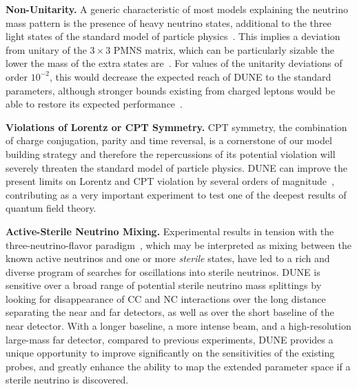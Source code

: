 {\bf Non-Unitarity.} 
A generic characteristic of most models explaining the neutrino mass
pattern is the presence of heavy neutrino states, additional to the
three light states of the standard model of particle
physics~\cite{Minkowski:1977sc,Mohapatra:1979ia,Yanagida:1979as,GellMann:1980vs}. This implies a deviation from unitary of the $3\times3$ PMNS matrix, which can be particularly sizable the lower the mass of the extra states are~\cite{Mohapatra:1986bd,Akhmedov:1995vm,Akhmedov:1995ip,Malinsky:2005bi}.
For values of the unitarity deviations of order $10^{-2}$, this would decrease the expected reach of DUNE to the standard parameters, although stronger bounds existing from charged leptons would be able to restore its expected performance~\cite{Blennow:2016jkn,Escrihuela:2016ube}.

{\bf Violations of Lorentz or CPT Symmetry.}
CPT symmetry, the combination of charge conjugation, parity and time reversal, is a cornerstone of our model building strategy and therefore the repercussions of its potential violation will severely threaten the standard model of particle physics. DUNE can improve the present limits on Lorentz and CPT violation by several orders of magnitude~\cite{Kostelecky:2003cr,Kostelecky:2011gq,Streater:1989vi,Barenboim:2002tz,Barenboim:2017ewj}, contributing
as a very important experiment to test one of the deepest results of quantum field theory.

{\bf Active-Sterile Neutrino Mixing.}
Experimental results in tension with the three-neutrino-flavor paradigm~\cite{Aguilar:2001ty,Aguilar-Arevalo:2013pmq,Acero:2007su,Mention:2011rk}, which may be interpreted as mixing between the known active neutrinos and one or more {\it sterile} states, have led to a rich and diverse program of searches for oscillations into sterile neutrinos.
DUNE is sensitive over a broad range of potential sterile neutrino mass splittings by looking for disappearance of CC and NC interactions over the long distance separating the near and far detectors, as well as over the short baseline of the near detector. 
With a longer baseline, a more intense beam, and a high-resolution large-mass far detector, compared to previous experiments, DUNE provides a unique opportunity to improve significantly on the sensitivities of the existing probes, and greatly enhance the ability to map the extended parameter space if a sterile neutrino is discovered.

